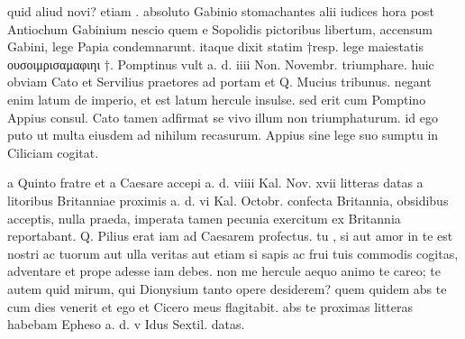  quid aliud novi? etiam . absoluto Gabinio stomachantes alii iudices hora post Antiochum Gabinium nescio quem e Sopolidis pictoribus libertum, accensum Gabini, lege Papia condemnarunt. itaque dixit statim †resp. lege maiestatis ουσοιμρισαμαφιηι †. Pomptinus vult a. d. iiii Non. Novembr. triumphare. huic obviam Cato et Servilius praetores ad portam et Q. Mucius tribunus. negant enim latum de imperio, et est latum hercule insulse. sed erit cum Pomptino Appius consul. Cato tamen adfirmat se vivo illum non triumphaturum. id ego puto ut multa eiusdem ad nihilum recasurum. Appius sine lege suo sumptu in Ciliciam cogitat.

 a Quinto fratre et a Caesare accepi a. d. viiii Kal. Nov. xvii litteras datas a litoribus Britanniae proximis a. d. vi Kal. Octobr. confecta Britannia, obsidibus acceptis, nulla praeda, imperata tamen pecunia exercitum ex Britannia reportabant. Q. Pilius erat iam ad Caesarem profectus. tu , si aut amor in te est nostri ac tuorum aut ulla veritas aut etiam si sapis ac frui tuis commodis cogitas, adventare et prope adesse iam debes. non me hercule aequo animo te careo; te autem quid mirum, qui Dionysium tanto opere desiderem? quem quidem abs te cum dies venerit et ego et Cicero meus flagitabit. abs te proximas litteras habebam Epheso a. d. v Idus Sextil. datas.
